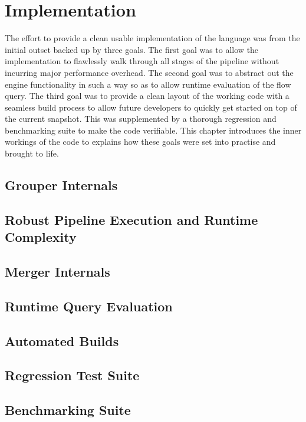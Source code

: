 \chapter{Implementation}\label{ch:implementation}

The effort to provide a clean usable implementation of the language was from
the initial outset backed up by three goals. The first goal was to allow the
implementation to flawlessly walk through all stages of the pipeline without
incurring major performance overhead. The second goal was to abstract out the
engine functionality in such a way so as to allow runtime evaluation of the
flow query. The third goal was to provide a clean layout of the working code
with a seamless build process to allow future developers to quickly get
started on top of the current snapshot. This was supplemented by a thorough
regression and benchmarking suite to make the code verifiable. This chapter
introduces the inner workings of the code to explains how these goals were set
into practise and brought to life.

\section{Grouper Internals}\label{sec:grouper-internals}

\section{Robust Pipeline Execution and Runtime Complexity}\label{sec:pipeline}

\section{Merger Internals}\label{sec:merger-internals}

\section{Runtime Query Evaluation}\label{sec:runtime-query}

\section{Automated Builds}\label{sec:automated-builds}

\section{Regression Test Suite}\label{sec:regression-suite}

\section{Benchmarking Suite}\label{sec:benchmarking-suite}

